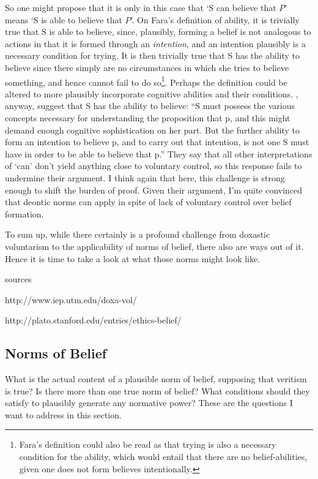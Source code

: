 \documentclass[12pt,numbers=noenddot]{scrartcl}
\begin{document}
So one might propose that it is only in this case that ‘S can believe that $P$’ means ‘S is able to believe that $P$’. On Fara's definition of ability, it is trivially true that S is able to believe, since, plausibly, forming a belief is not analogous to actions in that it is formed through an \emph{intention}, and an intention plausibly is a necessary condition for trying. It is then trivially true that S has the ability to believe since there simply are no circumstances in which she tries to believe something, and hence cannot fail to do so\footnote{Fara's definition could also be read as that trying is also a necessary condition for the ability, which would entail that there are no belief-abilities, given one does not form believes intentionally.}. Perhaps the definition could be altered to more plausibly incorporate cognitive abilities and their conditions. \textcite[618]{Chuard2009-CHUENW}, anyway, suggest that S has the ability to believe: “S must possess the various concepts necessary for understanding the proposition that p, and this might demand enough cognitive sophistication on her part. But the further ability to form an intention to believe p, and to carry out that intention, is not one S must have in order to be able to believe that p.” They say that all other interpretations of ‘can’ don't yield anything close to voluntary control, so this response fails to undermine their argument. I think again that here, this challenge is strong enough to shift the burden of proof. Given their argument, I'm quite convinced that deontic norms can apply in spite of lack of voluntary control over belief formation.

To sum up, while there certainly is a profound challenge from doxastic voluntarism to the applicability of norms of belief, there also are ways out of it. Hence it is time to take a look at what those norms might look like.

sources

http://www.iep.utm.edu/doxa-vol/

http://plato.stanford.edu/entries/ethics-belief/

\textcite{KruseForthcoming-KRUWDR}

\textcite{Steup1988-STETDC Steup2000-STEDVA}

\textcite{Alston1985-ALSCOE}

\textcite{Feldman2001-FELVBA}

\textcite[238-246]{grundmann2008}

\subsection{ Norms of Belief }\label{sec:normsofbelief}
What is the actual content of a plausible norm of belief, supposing that veritism is true? Is there more than one true norm of belief? What conditions should they satisfy to plausibly generate any normative power? These are the questions I want to address in this section.
\end{document}
